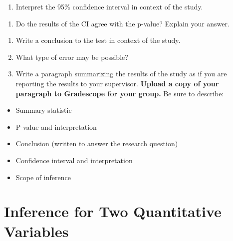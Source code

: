 \documentclass[
]{report}
\providecommand{\tightlist}{%
  \setlength{\itemsep}{0pt}\setlength{\parskip}{0pt}}
\begin{document}
\newpage

\begin{enumerate}
\def\labelenumi{\arabic{enumi}.}
\setcounter{enumi}{15}
\tightlist
\item
  Interpret the 95\% confidence interval in context of the study.
\end{enumerate}

\vspace{1in}

\begin{enumerate}
\def\labelenumi{\arabic{enumi}.}
\setcounter{enumi}{16}
\tightlist
\item
  Do the results of the CI agree with the p-value? Explain your answer.
\end{enumerate}

\vspace{0.5in}

\begin{enumerate}
\def\labelenumi{\arabic{enumi}.}
\setcounter{enumi}{17}
\item
  Write a conclusion to the test in context of the study.
  \vspace{0.8in}
\item
  What type of error may be possible?
  \vspace{0.2in}
\item
  Write a paragraph summarizing the results of the study as if you are reporting the results to your supervisor. \textbf{Upload a copy of your paragraph to Gradescope for your group.} Be sure to describe:
\end{enumerate}

\begin{itemize}
\item
  Summary statistic
\item
  P-value and interpretation
\item
  Conclusion (written to answer the research question)
\item
  Confidence interval and interpretation
\item
  Scope of inference
\end{itemize}

\vspace{3in}
\newpage

\hypertarget{inference-for-two-quantitative-variables}{%
\chapter{Inference for Two Quantitative Variables}\label{inference-for-two-quantitative-variables}}
\end{document}
